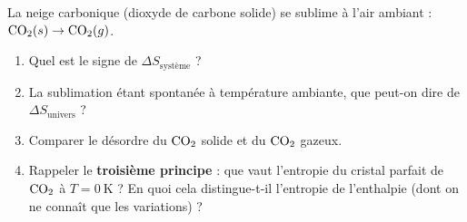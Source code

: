 \documentclass[11pt,a4paper]{article}
\newcommand{\dS}{\Delta S}
\begin{document}
\begin{exercice}
La neige carbonique (dioxyde de carbone solide) se sublime à l'air ambiant :
\;$\ce{CO2}(s) \rightarrow \ce{CO2}(g)$.
\begin{enumerate}[label=\alph*),leftmargin=2em,topsep=2pt,itemsep=2pt]
  \item Quel est le signe de $\dS_{\text{système}}$ ?
  \item La sublimation étant spontanée à température ambiante, que peut-on dire de $\dS_{\text{univers}}$ ?
  \item Comparer le désordre du $\ce{CO2}$ solide et du $\ce{CO2}$ gazeux.
  \item Rappeler le \textbf{troisième principe} : que vaut l'entropie du cristal parfait de $\ce{CO2}$ à
        $T=\SI{0}{\kelvin}$ ? En quoi cela distingue-t-il l'entropie de l'enthalpie (dont on ne connaît
        que les variations) ?
\end{enumerate}
\end{exercice}
\end{document}
